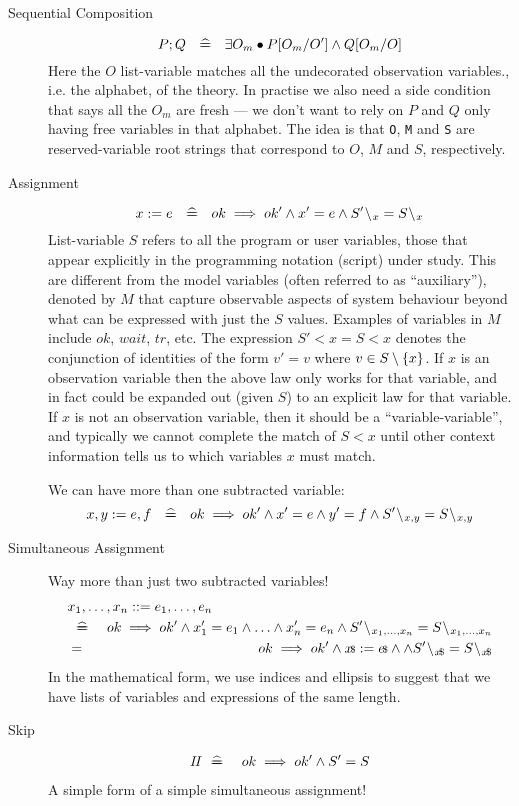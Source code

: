 \begin{description}
%
\item[Sequential Composition]
$$
  P ; Q ~\mathrel{~\widehat{=\!\!\!\!=}}~~ \exists O_m \bullet P[O_m/O'] \land Q[O_m/O]
$$
Here the $O$ list-variable matches all the undecorated
observation variables., i.e. the alphabet, of the theory.
In practise we also need a side condition that says all the $O_m$
are fresh --- we don't want to rely on $P$ and $Q$ only having free variables
in that alphabet.
The idea is that \texttt{O}, \texttt{M} and \texttt{S} are reserved-variable root strings that
correspond to $O$, $M$ and $S$, respectively.
%
\item[Assignment]
$$
  x := e ~\defs~ ok \implies ok' \land x' = e
    \land S'\less x = S\less x
$$
List-variable $S$ refers to all the program or user variables,
those that appear explicitly in the programming notation (script) under study.
This are different from the model variables (often referred to as
``auxiliary''), denoted by $M$ that capture observable aspects
of system behaviour beyond what can be expressed with just the $S$
values. Examples of variables in $M$ include $ok$, $wait$, $tr$, etc.
The expression $S'\less x = S\less x$
denotes the conjunction of identities of the form $v'=v$
where $v \in S\setminus\{{x}\}$.
If $x$ is an observation variable
then the above law only works for that variable,
and in fact could be expanded out (given $S$)
to an explicit law for that variable.
If $x$ is not an observation variable,
then it should be a ``variable-variable'',
and typically we cannot complete the match of $S\less x$
until
other context information tells us to which variables $x$ must match.
\par
We can have more than one subtracted variable:
$$
  x,y := e,f ~\defs~ ok \implies ok' \land x' = e \land y'=f
    \land S'\less{x,y} = S\less{x,y}
$$
\item[Simultaneous Assignment]
Way more than just two subtracted variables!
\begin{eqnarray*}
  \lefteqn{x_1,\ldots,x_n ::= e_1, \ldots , e_n}
\\ &\defs&
     ok \implies ok'
     \land x'_1 = e_1 \land \ldots \land x'_n = e_n
     \land S'\less{x_1,\ldots,x_n} = S\less{x_1,\ldots,x_n}
\\ &=& ok \implies ok'
    \land \lst x := \lst e \land
     \land S'\less{\lst x} = S\less{\lst x}
\end{eqnarray*}
In the mathematical form, we use indices and ellipsis
to suggest that we have lists of variables and expressions
of the same length.
\item[Skip]
\begin{eqnarray*}
  \mathit{I\!I} &\mathrel{~\widehat{=\!\!\!\!=}}~& ok \implies ok' \land S'=S
\end{eqnarray*}
A simple form of a simple simultaneous assignment!
\end{description}


